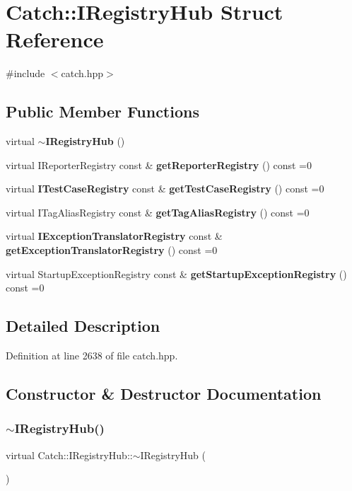 \section{Catch\+::I\+Registry\+Hub Struct Reference}
\label{struct_catch_1_1_i_registry_hub}


{\ttfamily \#include $<$catch.\+hpp$>$}

\subsection*{Public Member Functions}
\begin{DoxyCompactItemize}
\item 
virtual \textbf{ $\sim$\+I\+Registry\+Hub} ()
\item 
virtual I\+Reporter\+Registry const  \& \textbf{ get\+Reporter\+Registry} () const =0
\item 
virtual \textbf{ I\+Test\+Case\+Registry} const  \& \textbf{ get\+Test\+Case\+Registry} () const =0
\item 
virtual I\+Tag\+Alias\+Registry const  \& \textbf{ get\+Tag\+Alias\+Registry} () const =0
\item 
virtual \textbf{ I\+Exception\+Translator\+Registry} const  \& \textbf{ get\+Exception\+Translator\+Registry} () const =0
\item 
virtual Startup\+Exception\+Registry const  \& \textbf{ get\+Startup\+Exception\+Registry} () const =0
\end{DoxyCompactItemize}


\subsection{Detailed Description}


Definition at line 2638 of file catch.\+hpp.



\subsection{Constructor \& Destructor Documentation}
\mbox{\label{struct_catch_1_1_i_registry_hub_a050de0f27f96888c8b410992146c9a09}} 
\subsubsection{$\sim$IRegistryHub()}
{\footnotesize\ttfamily virtual Catch\+::\+I\+Registry\+Hub\+::$\sim$\+I\+Registry\+Hub (\begin{DoxyParamCaption}{ }\end{DoxyParamCaption})\hspace{0.3cm}{\ttfamily [virtual]}}



